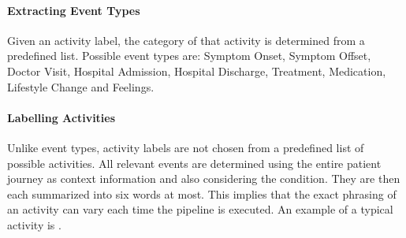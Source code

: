 \paragraph{Extracting Event Types} Given an activity label, the category of that activity is determined from a predefined list. Possible event types are: Symptom Onset, Symptom Offset, Doctor Visit, Hospital Admission, Hospital Discharge, Treatment, Medication, Lifestyle Change and Feelings.
\paragraph{Labelling Activities} Unlike event types, activity labels are not chosen from a predefined list of possible activities. All relevant events are determined using the entire patient journey as context information and also considering the condition. They are then each summarized into six words at most. This implies that the exact phrasing of an activity can vary each time the pipeline is executed. An example of a typical activity is .
